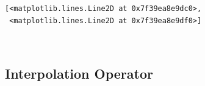 \documentclass[11pt]{article}
\makeatletter
\newcommand{\boxspacing}{\kern\kvtcb@left@rule\kern\kvtcb@boxsep}
\newcommand{\prompt}[4]{
        \ttfamily\llap{{\color{#2}[#3]:\hspace{3pt}#4}}\vspace{-\baselineskip}
    }
\makeatother
\begin{document}
            \begin{tcolorbox}[breakable, size=fbox, boxrule=.5pt, pad at break*=1mm, opacityfill=0]
\prompt{Out}{outcolor}{9}{\boxspacing}
\begin{Verbatim}[commandchars=\\\{\}]
[<matplotlib.lines.Line2D at 0x7f39ea8e9dc0>,
 <matplotlib.lines.Line2D at 0x7f39ea8e9df0>]
\end{Verbatim}
\end{tcolorbox}
        
    \begin{center}
    \end{center}
    { \hspace*{\fill} \\}
    
    \hypertarget{interpolation-operator}{%
\subsection{Interpolation Operator}\label{interpolation-operator}}
\end{document}
